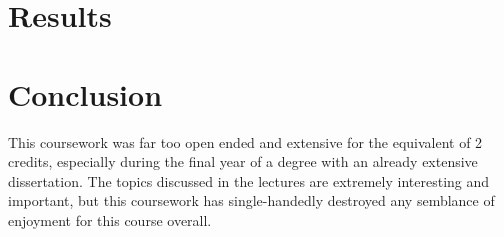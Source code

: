 \documentclass[11pt,a4]{article}
\begin{document}
\section{Results}

\section{Conclusion}
This coursework was far too open ended and extensive for the equivalent
of 2 credits, especially during the final year of a degree with an already
extensive dissertation.
The topics discussed in the lectures are extremely interesting and important,
but this coursework has single-handedly destroyed any semblance of enjoyment
for this course overall.
\end{document}
